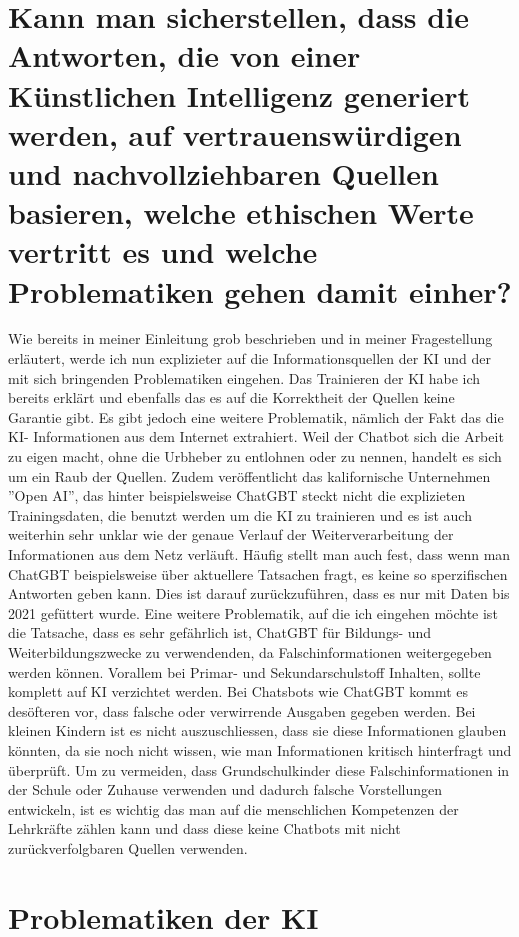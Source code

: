 \documentclass{article}
\begin{document}
\section{Kann man sicherstellen, dass die Antworten, die von einer Künstlichen Intelligenz generiert werden, auf vertrauenswürdigen und nachvollziehbaren Quellen basieren, welche ethischen Werte vertritt es und welche Problematiken gehen damit einher?}
Wie bereits in meiner Einleitung grob beschrieben und in meiner Fragestellung erläutert, werde ich nun explizieter auf die Informationsquellen der KI und der mit sich bringenden Problematiken eingehen. Das Trainieren der KI habe ich bereits erklärt und ebenfalls das es auf die Korrektheit der Quellen keine Garantie gibt. Es gibt jedoch eine weitere Problematik, nämlich der Fakt das die KI- Informationen aus dem Internet extrahiert. Weil der Chatbot sich die Arbeit zu eigen macht, ohne die Urbheber zu entlohnen oder zu nennen, handelt  es sich um ein Raub der Quellen. Zudem veröffentlicht das kalifornische Unternehmen ''Open AI'', das hinter beispielsweise ChatGBT steckt nicht die explizieten Trainingsdaten, die benutzt werden um die KI zu trainieren und es ist auch weiterhin sehr unklar wie der genaue Verlauf der Weiterverarbeitung der Informationen aus dem Netz verläuft. Häufig stellt man auch fest, dass wenn man ChatGBT beispielsweise über aktuellere Tatsachen fragt, es keine so sperzifischen Antworten geben kann. Dies ist darauf zurückzuführen, dass es nur mit Daten bis 2021 gefüttert wurde. Eine weitere Problematik, auf die ich eingehen möchte ist die Tatsache, dass es sehr gefährlich ist, ChatGBT für Bildungs- und Weiterbildungszwecke zu verwendenden, da Falschinformationen weitergegeben werden können. Vorallem bei Primar- und Sekundarschulstoff Inhalten, sollte komplett auf KI verzichtet werden. 
Bei Chatsbots wie ChatGBT kommt es desöfteren vor, dass falsche oder verwirrende Ausgaben gegeben werden. Bei kleinen Kindern ist es nicht auszuschliessen, dass sie diese Informationen glauben könnten, da sie noch nicht wissen, wie man Informationen kritisch hinterfragt und überprüft. Um zu vermeiden, dass Grundschulkinder diese Falschinformationen in der Schule oder Zuhause verwenden und dadurch falsche Vorstellungen entwickeln, ist es wichtig das man auf die menschlichen Kompetenzen der Lehrkräfte zählen kann und dass diese keine Chatbots mit nicht zurückverfolgbaren Quellen verwenden.  

\section{Problematiken der KI}
\end{document}
